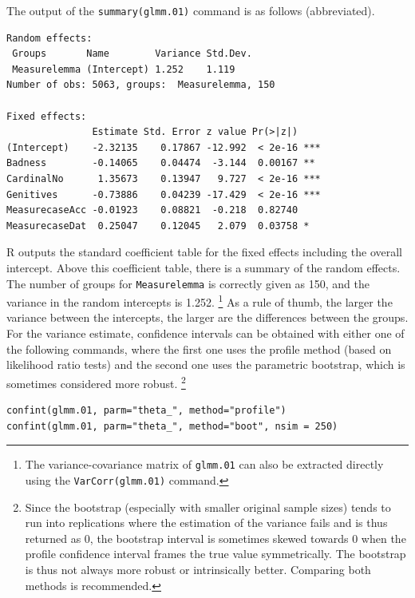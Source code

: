 The output of the \texttt{summary(glmm.01)} command is as follows (abbreviated).

\vspace{0.5\baselineskip}

\begin{lstlisting}
Random effects:
 Groups       Name        Variance Std.Dev.
 Measurelemma (Intercept) 1.252    1.119   
Number of obs: 5063, groups:  Measurelemma, 150

Fixed effects:
               Estimate Std. Error z value Pr(>|z|)    
(Intercept)    -2.32135    0.17867 -12.992  < 2e-16 ***
Badness        -0.14065    0.04474  -3.144  0.00167 ** 
CardinalNo      1.35673    0.13947   9.727  < 2e-16 ***
Genitives      -0.73886    0.04239 -17.429  < 2e-16 ***
MeasurecaseAcc -0.01923    0.08821  -0.218  0.82740    
MeasurecaseDat  0.25047    0.12045   2.079  0.03758 *  
\end{lstlisting}

R outputs the standard coefficient table for the fixed effects including the overall intercept.
Above this coefficient table, there is a summary of the random effects.
The number of groups for \texttt{Measurelemma} is correctly given as 150, and the variance in the random intercepts is 1.252.%
\footnote{The variance-covariance matrix of \texttt{glmm.01} can also be extracted directly using the \texttt{VarCorr(glmm.01)} command.}
As a rule of thumb, the larger the variance between the intercepts, the larger are the differences between the groups.
For the variance estimate, confidence intervals can be obtained with either one of the following commands, where the first one uses the profile method (based on likelihood ratio tests) and the second one uses the parametric bootstrap, which is sometimes considered more robust.%
\footnote{Since the bootstrap (especially with smaller original sample sizes) tends to run into replications where the estimation of the variance fails and is thus returned as 0, the bootstrap interval is sometimes skewed towards 0 when the profile confidence interval frames the true value symmetrically. The bootstrap is thus not always more robust or intrinsically better.
Comparing both methods is recommended.}

\vspace{0.5\baselineskip}

\begin{lstlisting}
confint(glmm.01, parm="theta_", method="profile")
confint(glmm.01, parm="theta_", method="boot", nsim = 250)
\end{lstlisting}

